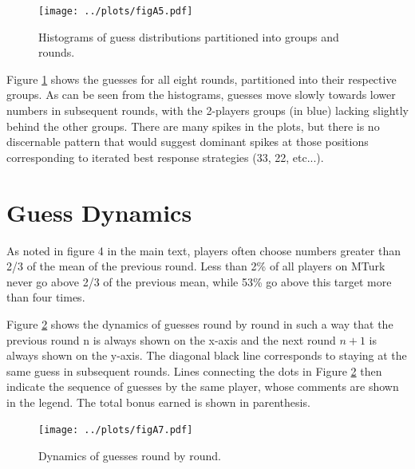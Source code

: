 \begin{figure}
\texttt{[image: ../plots/figA5.pdf]}\caption{Histograms of guess distributions partitioned into groups and rounds.}
\label{Fig S5}
\end{figure}

Figure \ref{Fig S5} shows the guesses for all eight rounds, partitioned into their respective groups. As can be seen from the histograms, guesses move slowly towards lower numbers in subsequent rounds, with the 2-players groups (in blue) lacking slightly behind the other groups. There are many spikes in the plots, but there is no discernable pattern that would suggest dominant spikes at those positions corresponding to iterated best response strategies (33, 22, etc...).

\section{Guess Dynamics}
As noted in figure 4 in the main text, players often choose numbers greater than 2/3 of the mean of the previous round. Less than 2\% of all players on MTurk never go above 2/3 of the previous mean, while 53\% go above this target more than four times. 

%
%
Figure \ref{Fig S7} shows the dynamics of guesses round by round in such a way that the previous round n is always shown on the x-axis and the next round $n+1$ is always shown on the y-axis. The diagonal black line corresponds to staying at the same guess in subsequent rounds. Lines connecting the dots in Figure \ref{Fig S7} then indicate the sequence of guesses by the same player, whose comments are shown in the legend. The total bonus earned is shown in parenthesis.

\begin{figure}
\texttt{[image: ../plots/figA7.pdf]}\caption{Dynamics of guesses round by round.}
\label{Fig S7}
\end{figure}

